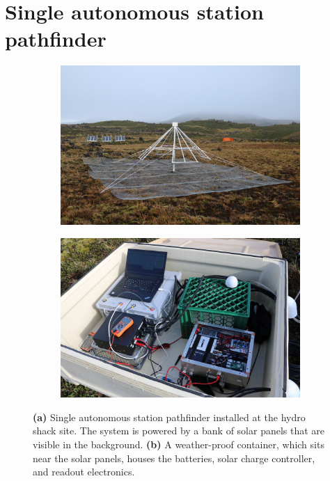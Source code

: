 \documentclass{ws-jai}
\begin{document}
\section{Single autonomous station pathfinder}\label{s:autonomous}

\begin{figure}
    \centering
    \begin{subfigure}[t]{0.48\textwidth}
        \centering
        \includegraphics[width=\linewidth]{Figures/autonomous.jpg} 
        \caption{} \label{Fig:autonomous_antenna}
    \end{subfigure}
    \hfill
    \begin{subfigure}[t]{0.48\textwidth}
      \centering
        \includegraphics[width=\linewidth]{Figures/container.jpg}
        \caption{} \label{Fig:autonomous_electronics}
    \end{subfigure}
    \caption{{\bf (a)} Single autonomous station pathfinder installed
      at the hydro shack site.  The system is powered by a bank of
      solar panels that are visible in the background. {\bf (b)} A
      weather-proof container, which sits near the solar panels,
      houses the batteries, solar charge controller, and readout
      electronics.}\label{Fig:autonomous}
\end{figure}
\end{document}
